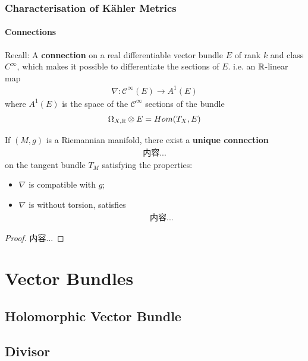 \documentclass[Total.tex]{subfiles}
\begin{document}
			\subsection{Characterisation of K\"{a}hler Metrics}
				\subsubsection{Connections}
					\begin{Def}
						Recall: A \textbf{connection} on a real differentiable vector bundle $E$ of rank $k$ and class $C^\infty$, which makes it possible to differentiate the sections of $E$. i.e. an $\mathbb{R}$-linear map
						\begin{gather*}
							\nabla:\mathcal{C}^\infty(E)\rightarrow A^1(E)
						\end{gather*}
						where $A^1(E)$ is the space of the $\mathcal{C}^\infty$ sections of the bundle
						\begin{gather*}
							\Omega_{X,\mathbb{R}}\otimes E=Hom(T_X,E)
						\end{gather*}
					\end{Def}
					
					\begin{proposition}
						If $(M,g)$ is a Riemannian manifold, there exist a \textbf{unique connection}
						\begin{gather*}
							内容...
						\end{gather*}
						on the tangent bundle $T_M$ satisfying the properties:
						\begin{itemize}
							\item $\nabla$ is compatible with $g$;
							\item $\nabla$ is without torsion, satisfies
							\begin{gather*}
								内容...
							\end{gather*}
						\end{itemize}
					\end{proposition}
					\begin{proof}
						内容...
					\end{proof}
	\chapter{Vector Bundles}
		\section{Holomorphic Vector Bundle}
		\section{Divisor}	
\end{document}
